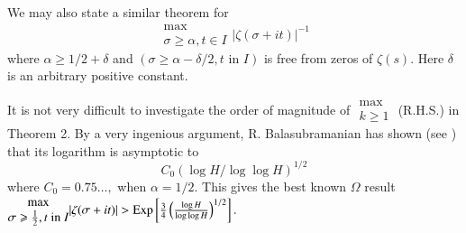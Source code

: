 \begin{remark*}
We may also state a similar theorem for 
$$
\begin{matrix}
\max\\
\sigma \geqslant \alpha, t \in I
\end{matrix} |\zeta (\sigma + it)|^{-1}
$$
where $\alpha \geqslant 1/2 + \delta$ and $(\sigma \geqslant \alpha - \delta/2, t \text{ in } I)$ is free from zeros of $\zeta(s)$. Here $\delta$ is an arbitrary positive constant. 

It is not very difficult to investigate the order of magnitude of $\begin{matrix}
\max\\ k \geqslant 1
\end{matrix}$ (R.H.S.) in Theorem 2. By a very ingenious argument, R. Balasubramanian has shown (see \cite{art2-key1}) that its logarithm is asymptotic to 
$$
C_0 (\log H/ \log \log H)^{1/2}
$$
where $C_0 = 0.75 \ldots, $ when $\alpha =1/2$. This gives the best known $\Omega$ result
$\begin{matrix}
\max\\
\sigma \geqslant \frac{1}{2}, t \text{ in  } I 
\end{matrix}|\zeta (\sigma + it) | > \operatorname{Exp} \left[\frac{3}{4} \left(\frac{\log H}{\log \log H} \right)^{1/2} \right].$ 


\end{remark*}
